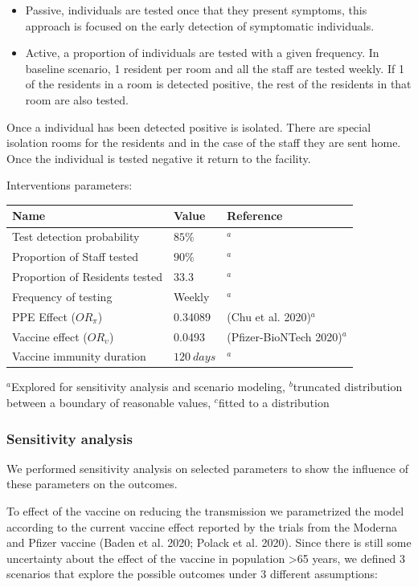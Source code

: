 \documentclass[
]{article}
\providecommand{\tightlist}{%
  \setlength{\itemsep}{0pt}\setlength{\parskip}{0pt}}
\begin{document}
\begin{itemize}
\tightlist
\item
  Passive, individuals are tested once that they present symptoms, this
  approach is focused on the early detection of symptomatic individuals.
\item
  Active, a proportion of individuals are tested with a given frequency.
  In baseline scenario, 1 resident per room and all the staff are tested
  weekly. If 1 of the residents in a room is detected positive, the rest
  of the residents in that room are also tested.
\end{itemize}

Once a individual has been detected positive is isolated. There are
special isolation rooms for the residents and in the case of the staff
they are sent home. Once the individual is tested negative it return to
the facility.

Interventions parameters:

\begin{longtable}[]{@{}lll@{}}
\toprule
Name & Value & Reference\tabularnewline
\midrule
\endhead
Test detection probability & \(85\%\) & \(^a\)\tabularnewline
Proportion of Staff tested & \(90\%\) & \(^a\)\tabularnewline
Proportion of Residents tested & \(33.3%
\) & \(^a\)\tabularnewline
Frequency of testing & Weekly & \(^a\)\tabularnewline
PPE Effect (\(OR_\pi\)) & 0.34089 & (Chu et al.
2020)\(^a\)\tabularnewline
Vaccine effect (\(OR_\upsilon\)) & 0.0493 & (Pfizer-BioNTech
2020)\(^a\)\tabularnewline
Vaccine immunity duration & \(120\ days\) & \(^a\)\tabularnewline
\bottomrule
\end{longtable}

\(^a\)Explored for sensitivity analysis and scenario modeling,
\(^b\)truncated distribution between a boundary of reasonable values,
\(^c\)fitted to a distribution

\hypertarget{sensitivity-analysis}{%
\subsubsection{Sensitivity analysis}\label{sensitivity-analysis}}

We performed sensitivity analysis on selected parameters to show the
influence of these parameters on the outcomes.

To effect of the vaccine on reducing the transmission we parametrized
the model according to the current vaccine effect reported by the trials
from the Moderna and Pfizer vaccine (Baden et al. 2020; Polack et al.
2020). Since there is still some uncertainty about the effect of the
vaccine in population \textgreater65 years, we defined 3 scenarios that
explore the possible outcomes under 3 different assumptions:
\end{document}

